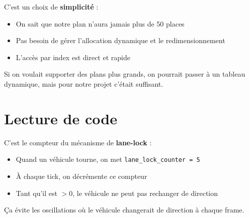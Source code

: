 \documentclass[11pt,a4paper]{article}
\newcommand{\keyword}[1]{\textcolor{primary}{\textbf{#1}}}
\newcommand{\code}[1]{\texttt{\textcolor{accent}{#1}}}
\begin{document}
\vspace{0.3cm}

\begin{questionbox}
\end{questionbox}

\begin{reponsebox}
C'est un choix de \keyword{simplicité} :
\begin{itemize}[noitemsep]
    \item On sait que notre plan n'aura jamais plus de 50 places
    \item Pas besoin de gérer l'allocation dynamique et le redimensionnement
    \item L'accès par index est direct et rapide
\end{itemize}
Si on voulait supporter des plans plus grands, on pourrait passer à un tableau dynamique, mais pour notre projet c'était suffisant.
\end{reponsebox}

\section{Lecture de code}

\begin{questionbox}
\end{questionbox}

\begin{reponsebox}
C'est le compteur du mécanisme de \keyword{lane-lock} :
\begin{itemize}[noitemsep]
    \item Quand un véhicule tourne, on met \code{lane\_lock\_counter = 5}
    \item À chaque tick, on décrémente ce compteur
    \item Tant qu'il est $> 0$, le véhicule ne peut pas rechanger de direction
\end{itemize}
Ça évite les oscillations où le véhicule changerait de direction à chaque frame.
\end{reponsebox}

\vspace{0.3cm}

\begin{questionbox}
\end{questionbox}
\end{document}
